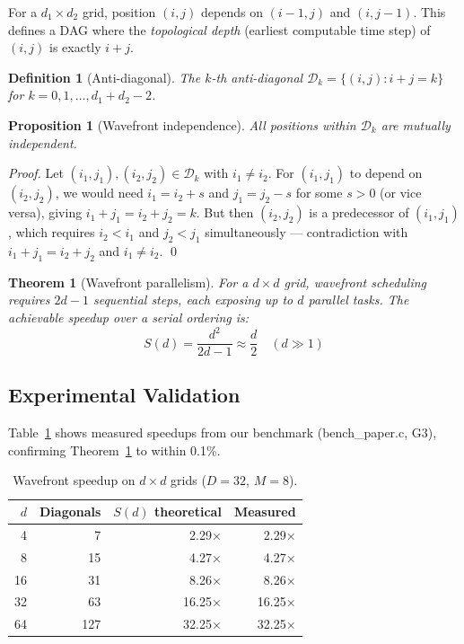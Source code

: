 \documentclass[10pt,onecolumn]{article}
\newtheorem{theorem}{Theorem}
\newtheorem{proposition}{Proposition}
\newtheorem{definition}{Definition}
\begin{document}
For a $d_1 \times d_2$ grid, position $(i,j)$ depends on $(i{-}1,j)$
and $(i,j{-}1)$. This defines a DAG where the \emph{topological depth}
(earliest computable time step) of $(i,j)$ is exactly $i + j$.

\begin{definition}[Anti-diagonal]
  The $k$-th anti-diagonal $\mathcal{D}_k = \{(i,j) : i+j = k\}$
  for $k = 0, 1, \ldots, d_1 + d_2 - 2$.
\end{definition}

\begin{proposition}[Wavefront independence]
  All positions within $\mathcal{D}_k$ are mutually independent.
\end{proposition}

\begin{proof}
  Let $(i_1, j_1), (i_2, j_2) \in \mathcal{D}_k$ with $i_1 \neq i_2$.
  For $(i_1, j_1)$ to depend on $(i_2, j_2)$, we would need
  $i_1 = i_2 + s$ and $j_1 = j_2 - s$ for some $s > 0$ (or vice versa),
  giving $i_1 + j_1 = i_2 + j_2 = k$. But then $(i_2, j_2)$ is a predecessor
  of $(i_1, j_1)$, which requires $i_2 < i_1$ and $j_2 < j_1$ simultaneously —
  contradiction with $i_1 + j_1 = i_2 + j_2$ and $i_1 \neq i_2$. \qed
\end{proof}

\begin{theorem}[Wavefront parallelism]
\label{thm:wavefront}
  For a $d \times d$ grid, wavefront scheduling requires
  $2d - 1$ sequential steps, each exposing up to $d$ parallel tasks.
  The achievable speedup over a serial ordering is:
  \begin{equation}
    S(d) = \frac{d^2}{2d - 1} \approx \frac{d}{2} \quad (d \gg 1)
  \end{equation}
\end{theorem}

\subsection{Experimental Validation}

Table~\ref{tab:wavefront} shows measured speedups from our benchmark
(bench\_paper.c, G3), confirming Theorem~\ref{thm:wavefront} to within 0.1\%.

\begin{table}[htbp]
\centering
\caption{Wavefront speedup on $d \times d$ grids ($D{=}32$, $M{=}8$).}
\label{tab:wavefront}
\begin{tabular}{rrrr}
\toprule
$d$ & Diagonals & $S(d)$ theoretical & Measured \\
\midrule
4  & 7   & 2.29× & 2.29× \\
8  & 15  & 4.27× & 4.27× \\
16 & 31  & 8.26× & 8.26× \\
32 & 63  & 16.25× & 16.25× \\
64 & 127 & 32.25× & 32.25× \\
\bottomrule
\end{tabular}
\end{table}
\end{document}

